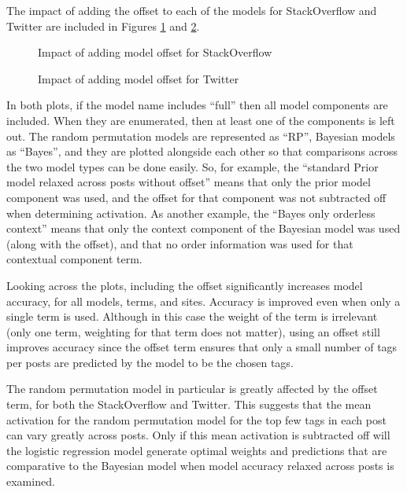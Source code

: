 \documentclass[man,floatsintext,donotrepeattitle]{apa6}
\begin{document}
The impact of adding the offset to each of the models for StackOverflow and Twitter are included in Figures \ref{figContextOffsetSO} and \ref{figContextOffsetT}.

\begin{figure}[!htbp]
  \caption{Impact of adding model offset for StackOverflow}
  \label{figContextOffsetSO}
\end{figure}

\begin{figure}[!htbp]
  \caption{Impact of adding model offset for Twitter}
  \label{figContextOffsetT}
\end{figure}

In both plots, if the model name includes ``full'' then all model components are included.
When they are enumerated, then at least one of the components is left out.
The random permutation models are represented as ``RP'', Bayesian models as ``Bayes'', and they are plotted alongside each other so that comparisons across the two model types can be done easily.
So, for example, the ``standard Prior model relaxed across posts without offset'' means that only the prior model component was used, and the offset for that component was not subtracted off when determining activation.
As another example, the ``Bayes only orderless context'' means that only the context component of the Bayesian model was used (along with the offset), and that no order information was used for that contextual component term.

Looking across the plots, including the offset significantly increases model accuracy, for all models, terms, and sites.
Accuracy is improved even when only a single term is used.
Although in this case the weight of the term is irrelevant (only one term, weighting for that term does not matter),
using an offset still improves accuracy since the offset term ensures that only a small number of tags per posts are predicted by the model to be the chosen tags. 

The random permutation model in particular is greatly affected by the offset term, for both the StackOverflow and Twitter.
This suggests that the mean activation for the random permutation model for the top few tags in each post can vary greatly across posts.
Only if this mean activation is subtracted off will the logistic regression model generate optimal weights and predictions that are comparative to the Bayesian model when model accuracy relaxed across posts is examined.
\end{document}
